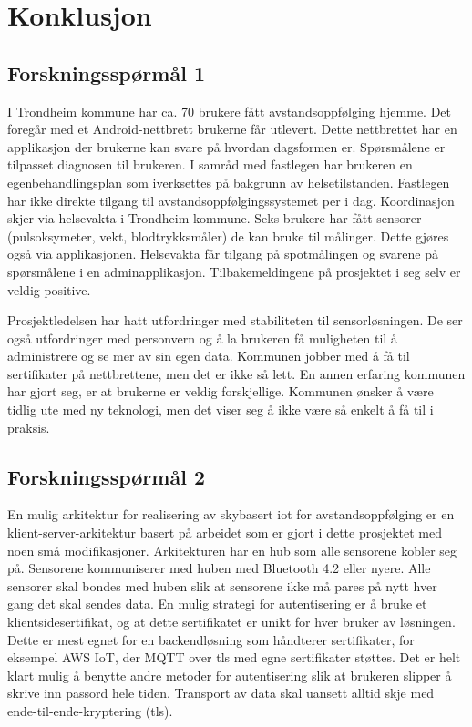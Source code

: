 \chapter{Konklusjon}
\label{ch:conclusion}

\section{Forskningsspørmål 1}
\textbf{}

I Trondheim kommune har ca. 70 brukere fått avstandsoppfølging hjemme. Det
foregår med et Android-nettbrett brukerne får utlevert. Dette nettbrettet har en
applikasjon der brukerne kan svare på hvordan dagsformen er. Spørsmålene er
tilpasset diagnosen til brukeren. I samråd med fastlegen har brukeren en
egenbehandlingsplan som iverksettes på bakgrunn av helsetilstanden. Fastlegen
har ikke direkte tilgang til avstandsoppfølgingssystemet per i dag. Koordinasjon skjer via
helsevakta i Trondheim kommune. Seks brukere har fått sensorer (pulsoksymeter, vekt, blodtrykksmåler) de kan bruke
til målinger. Dette gjøres også via applikasjonen. Helsevakta får tilgang på
spotmålingen og svarene på spørsmålene i en adminapplikasjon.
Tilbakemeldingene på prosjektet i seg selv er veldig positive.

Prosjektledelsen har hatt utfordringer med stabiliteten til sensorløsningen.
De ser også utfordringer med personvern og å la brukeren få muligheten til å administrere og se mer av sin egen data.
Kommunen jobber med å få til sertifikater på nettbrettene, men det er ikke så lett. En annen erfaring
kommunen har gjort seg, er at brukerne er veldig forskjellige. Kommunen ønsker å være tidlig ute med
ny teknologi, men det viser seg å ikke være så enkelt å få til i praksis.

\section{Forskningsspørmål 2}
\textbf{}

En mulig arkitektur for realisering av skybasert \gls{iot} for
avstandsoppfølging er en klient-server-arkitektur basert på arbeidet som er
gjort i dette prosjektet med noen små modifikasjoner. Arkitekturen har en hub som
alle sensorene kobler seg på. Sensorene kommuniserer med huben med Bluetooth 4.2
eller nyere. Alle sensorer skal bondes med huben slik at sensorene ikke må pares
på nytt hver gang det skal sendes data. En mulig strategi for autentisering er å
bruke et klientsidesertifikat, og at dette sertifikatet er unikt for hver bruker
av løsningen. Dette er mest egnet for en backendløsning som håndterer
sertifikater, for eksempel AWS IoT, der MQTT over \gls{tls} med egne sertifikater
støttes. Det er helt klart mulig å benytte andre metoder for autentisering slik
at brukeren slipper å skrive inn passord hele tiden. Transport av data skal
uansett alltid skje med ende-til-ende-kryptering (\gls{tls}).

